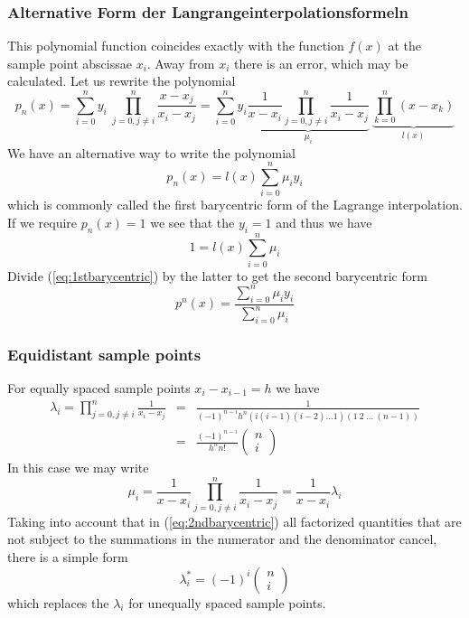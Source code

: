 \subsubsection{Alternative Form  der Langrangeinterpolationsformeln}
This polynomial function coincides exactly with the function $f(x)$ at the
sample point abscissae $x_i$. Away from $x_i$ there is an error, which may be
calculated.
Let us rewrite the polynomial
\[ p_n(x)=\sum_{i=0}^n y_i\ \prod_{j=0,j\neq i}^n\frac{x-x_j}{x_i-x_j}=
\sum_{i=0}^n y_i 
\underbrace{
\frac{1}{x-x_i} \prod_{j=0,j\neq i}^n\frac{1}{x_i-x_j} 
}_{\mu_i}\ 
\underbrace{\prod_{k=0}^n (x-x_k)}_{l(x)}
\]
We have an alternative way to write the polynomial
\begin{equation}\label{eq:1stbarycentric}
	p_n(x) = l(x)\sum_{i=0}^n \mu_iy_i
\end{equation}
which is commonly called the first barycentric form of the Lagrange
interpolation.  If we require $p_n(x)=1$ we see that the $y_i=1$ and thus we
have
\[ 1 = l(x)\sum_{i=0}^n \mu_i \]
Divide (\ref{eq:1stbarycentric}) by the latter to get the second barycentric
form
\begin{equation}
	p^n(x)=\frac{\sum_{i=0}^n \mu_iy_i}{\sum_{i=0}^n \mu_i}
	\label{eq:2ndbarycentric}
\end{equation}
\subsubsection{Equidistant sample points}
For equally spaced sample points $x_i-x_{i-1}=h$ we have
\begin{eqnarray*}
\lambda_i =\prod_{j=0,j\neq i}^n\frac{1}{x_i-x_j} 
&=&\frac{1}{(-1)^{n-i}h^n(i(i-1)(i-2)\ldots1)(1\ 2\ \ldots\ (n-1))}\\[1ex]
&=&\frac{(-1)^{n-i}}{h^n n!}
\left(\begin{array}{c}n\\ i\end{array}\right)
\end{eqnarray*}
In this case we may write 
\[
\mu_i=\frac{1}{x-x_i} \prod_{j=0,j\neq i}^n\frac{1}{x_i-x_j}=
\frac{1}{x-x_i} \lambda_i
\]
Taking into account that in (\ref{eq:2ndbarycentric}) all factorized quantities
that are not subject to the summations in the numerator and the denominator
cancel, there is a simple form 
\[ 
\lambda_i^* = (-1)^i\left(\begin{array}{c}n\\ i\end{array}\right)
\]
which replaces the $\lambda_i$ for unequally spaced sample points.
